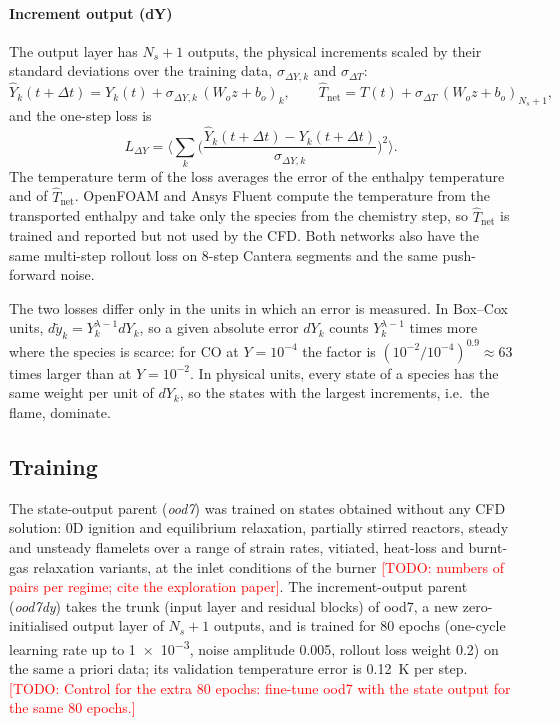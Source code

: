 \documentclass[preprint,review,12pt]{elsarticle}
\newcommand{\todo}[1]{\textcolor{red}{[TODO: #1]}}
\begin{document}
\paragraph{Increment output (dY)} The output layer has $N_s+1$ outputs, the physical increments scaled by
their standard deviations over the training data, $\sigma_{\Delta Y,k}$ and $\sigma_{\Delta T}$:
\begin{equation}
  \hat Y_k(t+\Delta t) = Y_k(t) + \sigma_{\Delta Y,k}\,(W_o z+b_o)_k,\qquad
  \hat T_\mathrm{net} = T(t) + \sigma_{\Delta T}\,(W_o z+b_o)_{N_s+1},
\end{equation}
and the one-step loss is
\begin{equation}
  L_{\Delta Y} = \Big\langle \sum_k \Big(\frac{\hat Y_k(t+\Delta t)-Y_k(t+\Delta t)}{\sigma_{\Delta Y,k}}\Big)^2\Big\rangle .
  \label{eq:lossdY}
\end{equation}
The temperature term of the loss averages the error of the enthalpy temperature and of
$\hat T_\mathrm{net}$. OpenFOAM and Ansys Fluent compute the temperature from the transported enthalpy
and take only the species from the chemistry step, so $\hat T_\mathrm{net}$ is trained and reported but
not used by the CFD. Both networks also have the same multi-step rollout loss on 8-step Cantera
segments and the same push-forward noise.

The two losses differ only in the units in which an error is measured. In Box--Cox units, $d\tilde y_k
= Y_k^{\lambda-1}dY_k$, so a given absolute error $dY_k$ counts $Y_k^{\lambda-1}$ times more where the
species is scarce: for CO at $Y=10^{-4}$ the factor is $(10^{-2}/10^{-4})^{0.9}\approx63$ times larger
than at $Y=10^{-2}$. In physical units, every state of a species has the same weight per
unit of $dY_k$, so the states with the largest increments, i.e.\ the flame, dominate.

\subsection{Training}
The state-output parent (\emph{ood7}) was trained on states obtained without any CFD solution: 0D
ignition and equilibrium relaxation, partially stirred reactors, steady and unsteady flamelets over
a range of strain rates, vitiated, heat-loss and burnt-gas relaxation variants, at the inlet
conditions of the burner \todo{numbers of pairs per regime; cite the exploration paper}. The
increment-output parent (\emph{ood7dy}) takes the trunk (input layer and residual blocks) of ood7, a new
zero-initialised output layer of $N_s+1$ outputs, and is trained for 80 epochs (one-cycle learning rate
up to \num{1e-3}, noise amplitude 0.005, rollout loss weight 0.2) on the same a priori data; its
validation temperature error is 0.12~K per step. \todo{Control for the extra 80 epochs: fine-tune ood7
with the state output for the same 80 epochs.}
\end{document}
